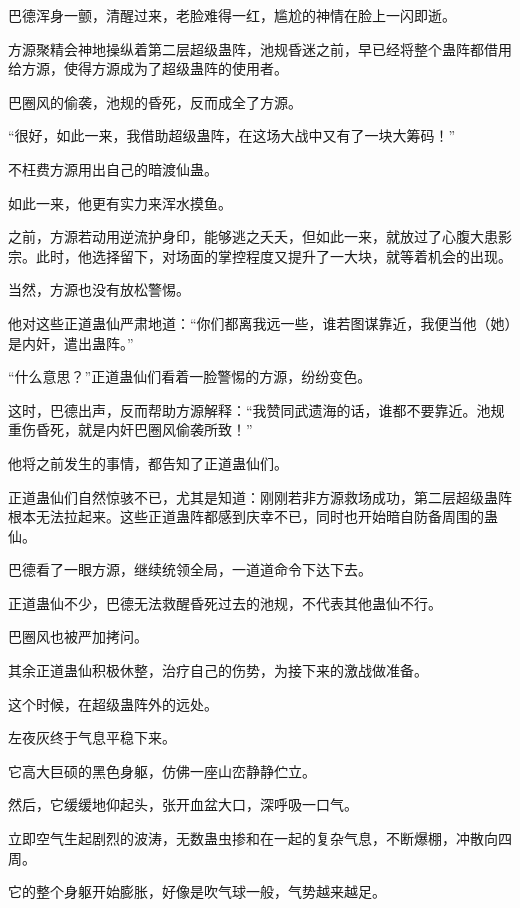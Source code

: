 
\begin{this_body}

巴德浑身一颤，清醒过来，老脸难得一红，尴尬的神情在脸上一闪即逝。

方源聚精会神地操纵着第二层超级蛊阵，池规昏迷之前，早已经将整个蛊阵都借用给方源，使得方源成为了超级蛊阵的使用者。

巴圈风的偷袭，池规的昏死，反而成全了方源。

“很好，如此一来，我借助超级蛊阵，在这场大战中又有了一块大筹码！”

不枉费方源用出自己的暗渡仙蛊。

如此一来，他更有实力来浑水摸鱼。

之前，方源若动用逆流护身印，能够逃之夭夭，但如此一来，就放过了心腹大患影宗。此时，他选择留下，对场面的掌控程度又提升了一大块，就等着机会的出现。

当然，方源也没有放松警惕。

他对这些正道蛊仙严肃地道：“你们都离我远一些，谁若图谋靠近，我便当他（她）是内奸，遣出蛊阵。”

“什么意思？”正道蛊仙们看着一脸警惕的方源，纷纷变色。

这时，巴德出声，反而帮助方源解释：“我赞同武遗海的话，谁都不要靠近。池规重伤昏死，就是内奸巴圈风偷袭所致！”

他将之前发生的事情，都告知了正道蛊仙们。

正道蛊仙们自然惊骇不已，尤其是知道：刚刚若非方源救场成功，第二层超级蛊阵根本无法拉起来。这些正道蛊阵都感到庆幸不已，同时也开始暗自防备周围的蛊仙。

巴德看了一眼方源，继续统领全局，一道道命令下达下去。

正道蛊仙不少，巴德无法救醒昏死过去的池规，不代表其他蛊仙不行。

巴圈风也被严加拷问。

其余正道蛊仙积极休整，治疗自己的伤势，为接下来的激战做准备。

这个时候，在超级蛊阵外的远处。

左夜灰终于气息平稳下来。

它高大巨硕的黑色身躯，仿佛一座山峦静静伫立。

然后，它缓缓地仰起头，张开血盆大口，深呼吸一口气。

立即空气生起剧烈的波涛，无数蛊虫掺和在一起的复杂气息，不断爆棚，冲散向四周。

它的整个身躯开始膨胀，好像是吹气球一般，气势越来越足。


\end{this_body}
